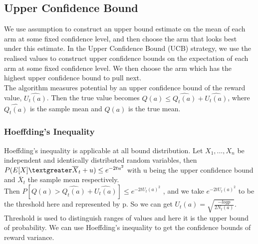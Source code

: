 \subsection{Upper Confidence Bound}
We use assumption to construct an upper bound estimate on the mean of each arm at some fixed confidence level, and then choose the arm that looks best under this estimate. \citep{SVGarbar2012} In the Upper Confidence Bound (UCB) strategy, we use the realised values to construct upper confidence bounds on the expectation of each arm at some fixed confidence level. We then choose the arm which has the highest upper confidence bound to pull next.
\\The algorithm measures potential by an upper confidence bound of the reward value, $\widehat{U_t (a)}$. Then the true value becomes $ Q(a)  \leq \widehat{Q_t (a)}+\widehat{U_t (a)} $, where  $ \widehat{Q_t (a)}$ is the sample mean
and $ Q(a)$ is the true mean.

\subsubsection{Hoeffding’s Inequality}
Hoeffding's inequality is applicable at all bound distribution. Let $X_1, ..., X_n$ be independent and identically distributed random variables, then $ P(E[X]  \textgreater \overline  X_t + u) \leq e^{-2t u^2}$ with u being the upper confidence bound and $ \overline X_t $ the sample mean respectively. \citep{Hoeffding1963}
\\Then $ P[Q(a) >\widehat{Q_t (a)}+\widehat{U_t (a)}] \leq e^{-2t U_t(a)^2}$ , and we take $e^{-2t U_t(a)^2} $ to be the threshold here and represented by p. So we can get $U_t(a) = \sqrt{\frac{-log p}{2N_t (a)}}$. Threshold is used to distinguish ranges of values and here it is the upper bound of probability.
We can use Hoeffding's inequality to get the confidence bounds of reward variance.

